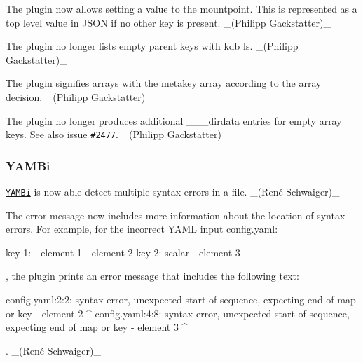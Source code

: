 \begin{DoxyItemize}
\item The plugin now allows setting a value to the mountpoint. This is represented as a top level value in J\+S\+ON if no other key is present. \+\_\+(\+Philipp Gackstatter)\+\_\+
\item The plugin no longer lists empty parent keys with {\ttfamily kdb ls}. \+\_\+(\+Philipp Gackstatter)\+\_\+
\item The plugin signifies arrays with the metakey array according to the \hyperlink{doc_decisions_array_md}{array decision}. \+\_\+(\+Philipp Gackstatter)\+\_\+
\item The plugin no longer produces additional {\ttfamily \+\_\+\+\_\+\+\_\+dirdata} entries for empty array keys. See also issue \href{https://github.com/ElektraInitiative/libelektra/issues/2477}{\tt \#2477}. \+\_\+(\+Philipp Gackstatter)\+\_\+
\end{DoxyItemize}

\subsubsection*{Y\+A\+M\+Bi}


\begin{DoxyItemize}
\item \href{https://www.libelektra.org/plugins/yambi}{\tt Y\+A\+M\+Bi} is now able detect multiple syntax errors in a file. \+\_\+(René Schwaiger)\+\_\+
\item The error message now includes more information about the location of syntax errors. For example, for the incorrect Y\+A\+ML input {\ttfamily config.\+yaml}\+:
\end{DoxyItemize}


\begin{DoxyCode}
key 1: - element 1
 - element 2
key 2: scalar
       - element 3
\end{DoxyCode}


, the plugin prints an error message that includes the following text\+:


\begin{DoxyCode}
config.yaml:2:2: syntax error, unexpected start of sequence, expecting end of map or key
                  - element 2
                  ^
config.yaml:4:8: syntax error, unexpected start of sequence, expecting end of map or key
                        - element 3
                        ^
\end{DoxyCode}


. \+\_\+(René Schwaiger)\+\_\+


